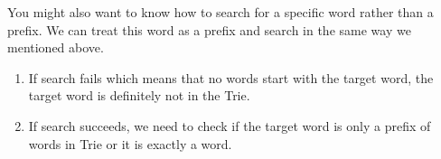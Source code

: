 You might also want to know how to search for a specific word rather than a prefix. We can treat this word as a prefix and search in the same way we mentioned above.  


\begin{enumerate}
\item If search fails which means that no words start with the target word, the target word is definitely not in the Trie.
\item If search succeeds, we need to check if the target word is only a prefix of words in Trie or it is exactly a word. 
\end{enumerate}


